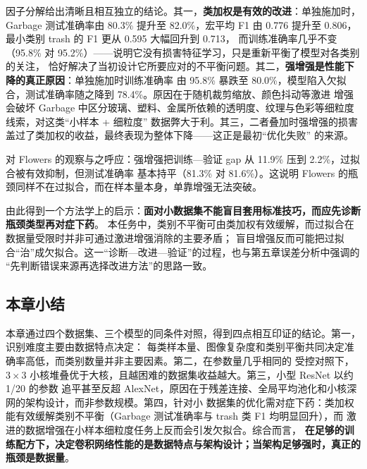\documentclass[12pt,a4paper,fontset=fandol]{ctexart}
\numberwithin{figure}{section}
\numberwithin{table}{section}
\numberwithin{equation}{section}
\begin{document}
\begin{table}[H]
  \centering
  \caption{Garbage 小数据优化的因子分解（AlexNet，3 种子均值）}
  \label{tab:smalldata}
\end{table}

因子分解给出清晰且相互独立的结论。其一，\textbf{类加权是有效的改进}：单独施加时，Garbage 测试准确率由
80.3\% 提升至 82.0\%，宏平均 F1 由 0.776 提升至 0.806，最小类别 trash 的 F1 更从 0.595 大幅回升到 0.713，
而训练准确率几乎不变（95.8\% 对 95.2\%）——说明它没有损害特征学习，只是重新平衡了模型对各类别的关注，
恰好解决了当初设计它所要应对的不平衡问题。其二，\textbf{强增强是性能下降的真正原因}：单独施加时训练准确率
由 95.8\% 暴跌至 80.0\%，模型陷入欠拟合，测试准确率随之降到 78.4\%。原因在于随机裁剪缩放、颜色抖动等激进
增强会破坏 Garbage 中区分玻璃、塑料、金属所依赖的透明度、纹理与色彩等细粒度线索，对这类“小样本 + 细粒度”
数据弊大于利。其三，二者叠加时强增强的损害盖过了类加权的收益，最终表现为整体下降——这正是最初“优化失败”
的来源。

对 Flowers 的观察与之呼应：强增强把训练—验证 gap 从 11.9\% 压到 2.2\%，过拟合被有效抑制，但测试准确率
基本持平（81.3\% 对 81.6\%）。这说明 Flowers 的瓶颈同样不在过拟合，而在样本量本身，单靠增强无法突破。

由此得到一个方法学上的启示：\textbf{面对小数据集不能盲目套用标准技巧，而应先诊断瓶颈类型再对症下药}。
本任务中，类别不平衡可由类加权有效缓解，而过拟合在数据量受限时并非可通过激进增强消除的主要矛盾；
盲目增强反而可能把过拟合“治”成欠拟合。这一“诊断—改进—验证”的过程，也与第五章误差分析中强调的
“先判断错误来源再选择改进方法”的思路一致。

\subsection{本章小结}
本章通过四个数据集、三个模型的同条件对照，得到四点相互印证的结论。第一，识别难度主要由数据特点决定：
每类样本量、图像复杂度和类别平衡共同决定准确率高低，而类别数量并非主要因素。第二，在参数量几乎相同的
受控对照下，$3\times3$ 小核堆叠优于大核，且越困难的数据集收益越大。第三，小型 ResNet 以约 1/20 的参数
追平甚至反超 AlexNet，原因在于残差连接、全局平均池化和小核深网的架构设计，而非参数规模。第四，针对小
数据集的优化需对症下药：类加权能有效缓解类别不平衡（Garbage 测试准确率与 trash 类 F1 均明显回升），而
激进的数据增强在小样本细粒度任务上反而会引发欠拟合。综合而言，
\textbf{在足够的训练配方下，决定卷积网络性能的是数据特点与架构设计；当架构足够强时，真正的瓶颈是数据量}。
\end{document}
